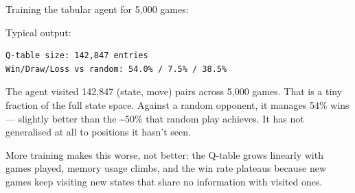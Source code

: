 Training the tabular agent for 5,000 games:

\begin{Shaded}
\begin{Highlighting}[]
\OperatorTok{=}\OperatorTok{=}\OperatorTok{=}\OperatorTok{=}\NormalTok{)}
\OperatorTok{=}\OperatorTok{=}\OperatorTok{=}\OperatorTok{=}\NormalTok{)}

 \NormalTok{(}\NormalTok{):}
\OperatorTok{=} \NormalTok{(}\NormalTok{, } \OperatorTok{*}\NormalTok{ (} \OperatorTok{{-}}\OperatorTok{/} \NormalTok{))}
\OperatorTok{=}\OperatorTok{=}

\NormalTok{(}\SpecialCharTok{\{}\SpecialCharTok{:,\}}\NormalTok{)}
\OperatorTok{=}
\NormalTok{(}\SpecialStringTok{ / }\SpecialStringTok{ / }\NormalTok{)}
\end{Highlighting}
\end{Shaded}

Typical output:

\begin{verbatim}
Q-table size: 142,847 entries
Win/Draw/Loss vs random: 54.0% / 7.5% / 38.5%
\end{verbatim}

The agent visited 142,847 (state, move) pairs across 5,000 games. That
is a tiny fraction of the full state space. Against a random opponent,
it manages 54\% wins --- slightly better than the \textasciitilde50\%
that random play achieves. It has not generalised at all to positions it
hasn't seen.

More training makes this worse, not better: the Q-table grows linearly
with games played, memory usage climbs, and the win rate plateaus
because new games keep visiting new states that share no information
with visited ones.

